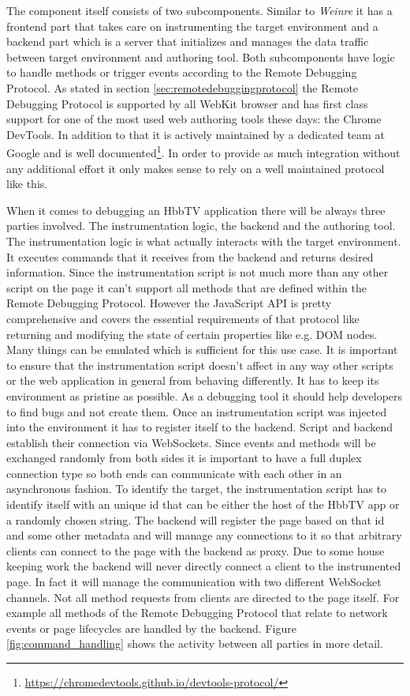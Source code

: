 The component itself consists of two subcomponents. Similar to \textit{Weinre} it has a frontend part that takes care on instrumenting the target environment and a backend part which is a server that initializes and manages the data traffic between target environment and authoring tool. Both subcomponents have logic to handle methods or trigger events according to the Remote Debugging Protocol. As stated in section \ref{sec:remotedebuggingprotocol} the Remote Debugging Protocol is supported by all WebKit browser and has first class support for one of the most used web authoring tools these days: the Chrome DevTools. In addition to that it is actively maintained by a dedicated team at Google and is well documented\footnote{\url{https://chromedevtools.github.io/devtools-protocol/}}. In order to provide as much integration without any additional effort it only makes sense to rely on a well maintained protocol like this.

When it comes to debugging an HbbTV application there will be always three parties involved. The instrumentation logic, the backend and the authoring tool. The instrumentation logic is what actually interacts with the target environment. It executes commands that it receives from the backend and returns desired information. Since the instrumentation script is not much more than any other script on the page it can't support all methods that are defined within the Remote Debugging Protocol. However the JavaScript API is pretty comprehensive and covers the essential requirements of that protocol like returning and modifying the state of certain properties like e.g. DOM nodes. Many things can be emulated which is sufficient for this use case. It is important to ensure that the instrumentation script doesn't affect in any way other scripts or the web application in general from behaving differently. It has to keep its environment as pristine as possible. As a debugging tool it should help developers to find bugs and not create them. Once an instrumentation script was injected into the environment it has to register itself to the backend. Script and backend establish their connection via WebSockets. Since events and methods will be exchanged randomly from both sides it is important to have a full duplex connection type so both ends can communicate with each other in an asynchronous fashion. To identify the target, the instrumentation script has to identify itself with an unique id that can be either the host of the HbbTV app or a randomly chosen string. The backend will register the page based on that id and some other metadata and will manage any connections to it so that arbitrary clients can connect to the page with the backend as proxy. Due to some house keeping work the backend will never directly connect a client to the instrumented page. In fact it will manage the communication with two different WebSocket channels. Not all method requests from clients are directed to the page itself. For example all methods of the Remote Debugging Protocol that relate to network events or page lifecycles are handled by the backend. Figure \ref{fig:command_handling} shows the activity between all parties in more detail.

